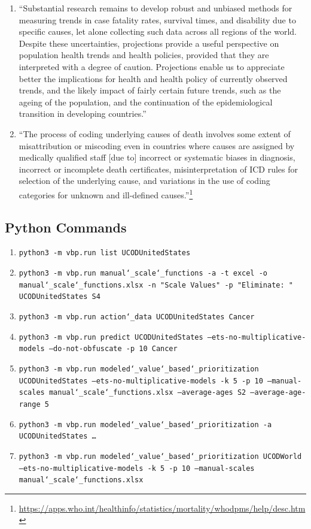 \documentclass[10pt, a4paper, twocolumn]{IEEEconf}
\begin{document}
\begin{enumerate}
  \item \enquote{Substantial research remains to develop robust and unbiased methods for measuring trends in case fatality rates, survival times, and disability due to specific causes, let alone collecting such data across all regions of the world. Despite these uncertainties, projections provide a useful perspective on population health trends and health policies, provided that they are interpreted with a degree of caution. Projections enable us to appreciate better the implications for health and health policy of currently observed trends, and the likely impact of fairly certain future trends, such as the ageing of the population, and the continuation of the epidemiological transition in developing countries.}\cite{mathers2006projections}
  \item \enquote{The process of coding underlying causes of death involves some extent of misattribution or miscoding even in countries where causes are assigned by medically qualified staff [due to] incorrect or systematic biases in diagnosis, incorrect or incomplete death certificates, misinterpretation of ICD rules for selection of the underlying cause, and variations in the use of coding categories for unknown and ill-defined causes.}\footnote{\scriptsize{\url{https://apps.who.int/healthinfo/statistics/mortality/whodpms/help/desc.htm}}}
\end{enumerate}

\onecolumn
\subsection{Python Commands}

\begin{enumerate}
  \item \label{cmdlist} \texttt{python3 -m vbp.run list UCODUnitedStates}
  \item \label{cmdmanualscales} \texttt{python3 -m vbp.run manual\char`_scale\char`_functions -a -t excel -o manual\char`_scale\char`_functions.xlsx -n "Scale Values" -p "Eliminate: " UCODUnitedStates S4}
  \item \label{cmdcancerdata} \texttt{python3 -m vbp.run action\char`_data UCODUnitedStates Cancer}
  \item \label{cmdcancerpredict} \texttt{python3 -m vbp.run predict UCODUnitedStates --ets-no-multiplicative-models --do-not-obfuscate -p 10 Cancer}
  \item \label{cmdlongtermcomparable} \texttt{python3 -m vbp.run modeled\char`_value\char`_based\char`_prioritization UCODUnitedStates --ets-no-multiplicative-models -k 5 -p 10 --manual-scales manual\char`_scale\char`_functions.xlsx --average-ages S2 --average-age-range 5}
  \item \label{cmdmodeledvbpus} \texttt{python3 -m vbp.run modeled\char`_value\char`_based\char`_prioritization -a UCODUnitedStates \ldots}
  \item \label{cmdmodeledvbpworld} \texttt{python3 -m vbp.run modeled\char`_value\char`_based\char`_prioritization UCODWorld --ets-no-multiplicative-models -k 5 -p 10 --manual-scales manual\char`_scale\char`_functions.xlsx}
\end{enumerate}
\end{document}

